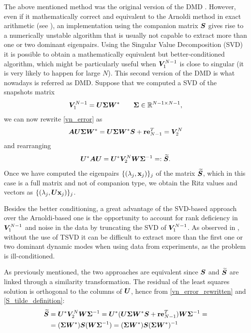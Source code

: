 The above mentioned method was the original version of the DMD \cite{schmid_dynamic_2010}. However, even if it mathematically correct and equivalent to the Arnoldi method in exact arithmetic (see ), an implementation using the companion matrix $\vb*{S}$ gives rise to a numerically unstable algorithm that is usually not capable to extract more than one or two dominant eigenpairs. Using the Singular Value Decomposition (SVD) it is possible to obtain a mathematically equivalent but better-conditioned algorithm, which might be particularly useful when $\vb*{V}_1^{N-1}$ is close to singular (it is very likely to happen for large $N$). This second version of the DMD is what nowadays is referred as DMD. Suppose that we computed a SVD of the snapshots matrix
\begin{equation*}
    \vb*{V}_1^{N-1} = \vb*{U}\vb*{\Sigma}\vb*{W}^* \qquad \vb*{\Sigma}\in\mathbb{R}^{N-1\times N-1},
\end{equation*}
we can now rewrite \eqref{vn_error} as
\begin{equation}
    \label{vn_error_rewritten}
    \vb*{A}\vb*{U}\vb*{\Sigma}\vb*{W}^* = \vb*{U}\vb*{\Sigma}\vb*{W}^*\vb*{S} + \vb{r}\vb{e}_{N-1}^T = \vb*{V}_2^N
\end{equation}
and rearranging
\begin{equation}
    \label{S_tilde_definition}
    \vb*{U}^*\vb*{A}\vb*{U} = \vb*{U}^*\vb*{V}_2^N\vb*{W}\vb*{\Sigma}^{-1} =: \widetilde{\vb*{S}}.
\end{equation}
Once we have computed the eigenpairs $\{(\lambda_j, \vb{x}_j)\}_j$ of the matrix $\widetilde{\vb*{S}}$, which in this case is a full matrix and not of companion type, we obtain the Ritz values and vectors as $\{(\lambda_j, \vb*{U}\vb{x}_j)\}_j$. 

Besides the better conditioning, a great advantage of the SVD-based approach over the Arnoldi-based one is the opportunity to account for rank deficiency in $\vb*{V}_1^{N-1}$ and noise in the data by truncating the SVD of $\vb*{V}_1^{N-1}$. As observed in \cite{schmid_dynamic_2010}, without the use of TSVD it can be difficult to extract more than the first one or two dominant dynamic modes when using data from experiments, as the problem is ill-conditioned. 

As previously mentioned, the two approaches are equivalent since $\vb*{S}$ and $\widetilde{\vb*{S}}$ are linked through a similarity transformation. The residual of the least squares solution is orthogonal to the columns of $\vb*{U}$, hence from \eqref{vn_error_rewritten} and \eqref{S_tilde_definition}:
\begin{equation*}
    \begin{split}
    \widetilde{\vb*{S}} & =
    \vb*{U}^*\vb*{V}_2^N\vb*{W}\vb*{\Sigma}^{-1} =
    \vb*{U}^*(\vb*{U}\vb*{\Sigma}\vb*{W}^*\vb*{S} + \vb{r}\vb{e}_{N-1}^T)\vb*{W}\vb*{\Sigma}^{-1} = \\
    & = (\vb*{\Sigma}\vb*{W}^*) \vb*{S} (\vb*{W}\vb*{\Sigma}^{-1}) =
    (\vb*{\Sigma}\vb*{W}^*) \vb*{S} (\vb*{\Sigma}\vb*{W}^*)^{-1}    
    \end{split}
\end{equation*}

